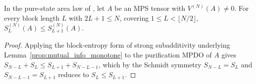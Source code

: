 \begin{lemma}\label{prop:pure_area_monotone}
    \leanok
    In the pure-state area law of \cite[Section~3, line~599]{Cirac2016MPDO_arXiv},
    let $A$ be an MPS tensor with $V^{(N)}(A)\neq0$. For every block length $L$
    with $2L+1\le N$, covering $1\le L<\lfloor N/2\rfloor$,
    $S_L^{(N)}(A)\le S_{L+1}^{(N)}(A)$.
\end{lemma}
\begin{proof}\leanok
    Applying the block-entropy form of strong subadditivity underlying
    Lemma~\ref{prop:mutual_info_monotone} to the purification
    MPDO of $A$ gives
    $S_{N-L}+S_L\le S_{L+1}+S_{N-L-1}$, which by the Schmidt
    symmetry $S_{N-L}=S_L$ and $S_{N-L-1}=S_{L+1}$ reduces to
    $S_L\le S_{L+1}$.
\end{proof}

